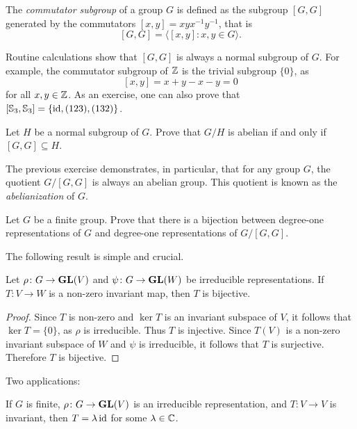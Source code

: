 The \emph{commutator subgroup} of a group $G$ is defined as the subgroup $[G,G]$ 
generated by the commutators $[x,y]=xyx^{-1}y^{-1}$, that is  
 \[
        [G,G]=\langle[x,y]: x,y\in G\rangle.
\]

Routine calculations show that $[G,G]$ is always a normal subgroup of $G$. 
For example, the commutator subgroup of $\mathbb{Z}$ is the trivial subgroup $\{0\}$, 
as 
\[
[x,y]=x+y-x-y=0
\]
for all $x,y\in\mathbb{Z}$. As an exercise, one can also prove that 
$[\mathbb{S}_3,\mathbb{S}_3]=\{\operatorname{id},(123),(132)\}$.

\begin{exercise}
\label{xca:commutator}
Let $H$ be a normal subgroup of $G$. Prove that
$G/H$ is abelian if and only if $[G,G]\subseteq H$.
\end{exercise}

The previous exercise demonstrates, in particular, that for any group 
$G$, the quotient $G/[G,G]$ is always an abelian group. 
This quotient is known as the \emph{abelianization} of 
$G$. 

\begin{exercise}
Let $G$ be a finite group.
Prove that there is a bijection between degree-one representations of $G$ and
degree-one representations of $G/[G,G]$.
\end{exercise}

The following result is simple and crucial. 

\begin{lemma}[Schur]
    Let $\rho\colon G\to\mathbf{GL}(V)$ and $\psi\colon G\to\mathbf{GL}(W)$ be irreducible representations. If 
    $T\colon V\to W$ is a non-zero invariant map, then $T$ is bijective.  
\end{lemma}

\begin{proof}
    Since $T$ is non-zero and $\ker T$ is an invariant subspace of $V$, it follows that $\ker T=\{0\}$, as $\rho$ is irreducible. Thus 
    $T$ is injective. Since $T(V)$ is a non-zero invariant subspace of $W$ and $\psi$ is irreducible, 
    it follows that $T$ is surjective. Therefore $T$ 
    is bijective.  
\end{proof}

Two applications:

\begin{proposition}
\label{pro:Schur_consequence}
    If $G$ is finite, $\rho\colon G\to\mathbf{GL}(V)$ is an irreducible representation, and $T\colon V\to V$ is invariant, then 
    $T=\lambda\operatorname{id}$ for some $\lambda\in\mathbb{C}$. 
\end{proposition}

